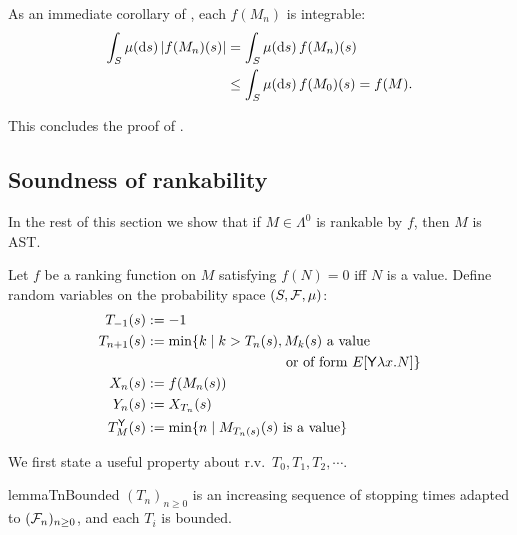 As an immediate corollary of , each $f(M_n)$ is integrable:
\begin{align*}
\int_{S} \mu(\mathrm{d} s) \, |f(M_n)(s)| 
&=
\int_{S} \mu(\mathrm{d} s) \, f(M_n)(s)
\\
&\leq
\int_{S} \mu(\mathrm{d} s) \, f(M_0)(s)
=
f(M).
\end{align*}

\iffalse
[** To see $f_{2, n+1}(M) \leq f(M_n)[T_2]$, take $s \in T_2$. Then $f_{2, n+1}(M)(s) = f(E[\underline{a}])$ and $M_n = E[\tsample]$, for some $a \in [0, 1]$ and evaluation context $E$. Hence 
\[
f_{2, n+1}(M)(s) \leq \int_I f(E[\underline{r}]) \, \mu_{leb}(\textrm{d} r)
\leq f(E[\tsample]) = f(M_n)[T_2](s).
\]
**]
\fi
This concludes the proof of %
. %

\subsection{Soundness of rankability}

In the rest of this section we show that if $M \in \Lambda^0$ is rankable by $f$, then $M$ is AST.

Let $f$ be a ranking function on $M$ satisfying $f(N) = 0$ iff $N$ is a value.
Define random variables on the probability space $(S, \mathcal{F}, \mu)$:
\begin{align}
T_{-1}(s) & := -1 \nonumber \\
T_{n+1}(s) & := \min \{ k \mid k>T_n(s), M_k(s) \textrm{ a value} \nonumber\\
& \qquad\qquad\qquad\qquad\qquad \hbox{or of form } E[\tY \lambda x. N] \} \nonumber \\
X_n(s) & := f(M_n(s)) \nonumber \\
Y_n(s) & := X_{T_n}(s) \nonumber \\
T_M^\tY(s) &:= \min \set{n \mid M_{T_n(s)}(s) \textrm{ is a value}} \label{eq:y stopping time} 
\end{align}



We first state a useful property about r.v.~$T_0, T_1, T_2, \cdots$.
\begin{restatable}{lemma}{TnBounded}
\label{lem:TnBounded}
$(T_n)_{n \geq 0}$ is an increasing sequence of stopping times adapted to $(\mathcal{F}_n)_{n \geq 0}$, and each $T_i$ is bounded.
\end{restatable}

